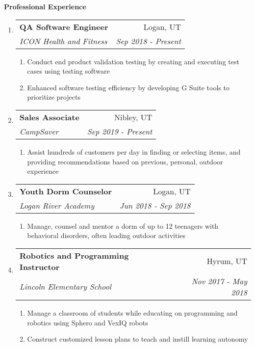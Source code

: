 \documentclass[letterpaper,10pt]{extarticle}
\makeatletter
\newcommand\tab[1][.25cm]{\hspace*{#1}} %
\newcommand{\resheading}[1]{{\large \colorbox{mygrey}{\begin{minipage}{\textwidth}{\textbf{#1 \vphantom{p\^{E}}}}\end{minipage}}}}
\newcommand{\ressubheading}[4]{
\begin{tabular*}{7.5in}{l@{\extracolsep{\fill}}r}
		\tab\textbf{#1} & #2 \\
		\tab\textit{#3} & \textit{#4} \\
\end{tabular*}\vspace{-6pt}}
\newcommand{\resitem}[1]{\item #1 \vspace{-2pt}}
\makeatother
\begin{document}
\resheading{Professional Experience}
\vspace{-0.2in}
\begin{enumerate}
\setlength\itemsep{-.5em}

\item[]
	\ressubheading{QA Software Engineer}{Logan, UT}{ICON Health and Fitness}{Sep 2018 - Present}
	\begin{enumerate}
		\setlength\itemsep{-.25em}
		\resitem[--]{Conduct end product validation testing by creating and executing test cases using testing software}
		\resitem[--]{Enhanced software testing efficiency by developing G Suite tools to prioritize projects}
	\end{enumerate}
\item[]
	\ressubheading{Sales Associate}{Nibley, UT}{CampSaver}{Sep 2019 - Present}
	\begin{enumerate}
		\setlength\itemsep{-.25em}
		\resitem[--]{Assist hundreds of customers per day in finding or selecting items, and providing recommendations based on previous, personal, outdoor experience}
	\end{enumerate}
\item[]
	\ressubheading{Youth Dorm Counselor}{Logan, UT}{Logan River Academy}{Jun 2018 - Sep 2018}
	\begin{enumerate}
		\setlength\itemsep{-.25em}
		\resitem[--]{Manage, counsel and mentor a dorm of up to 12 teenagers with behavioral disorders, often leading outdoor activities}
	\end{enumerate}


\item[]
	\ressubheading{Robotics and Programming Instructor}{Hyrum, UT}{Lincoln Elementary School}{Nov 2017 - May 2018}
	\begin{enumerate}
		\setlength\itemsep{-.25em}
		\resitem[--]{Manage a classroom of students while educating on programming and robotics using Sphero and VexIQ robots}
		\resitem[--]{Construct customized lesson plans to teach and instill learning autonomy}
	\end{enumerate}
\begin{comment}	
\item[]
	\ressubheading{Undergraduate Research Assistant}{Logan, UT}{Utah State University}{Oct 2016 - Oct 2017}
	\begin{enumerate}
		\resitem[--]{Research Focus: Next Generation Wireless Heterogeneous Networks (5G)}
	\end{enumerate}


\end{comment}
\end{enumerate}
\end{document}
